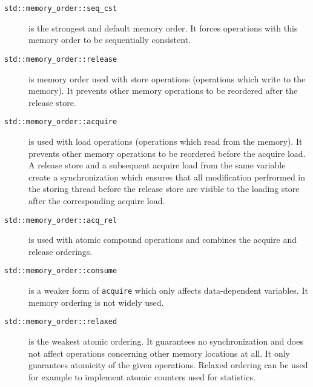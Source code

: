 \begin{description}
    \item[\texttt{std::memory\_order::seq\_cst}] is the strongest and default
        memory order.
        It forces operations with this memory order to be sequentially
        consistent.

        \item[\texttt{std::memory\_order::release}] is memory order used with
            store operations (operations which write to the memory).
            It prevents other memory operations to be reordered after the
            release store.

        \item[\texttt{std::memory\_order::acquire}] is used with load operations
            (operations which read from the memory).
            It prevents other memory operations to be reordered before the
            acquire load.
            A release store and a subsequent acquire load from the same variable
            create a synchronization which ensures that all modification
            perfrormed in the storing thread before the release store are
            visible to the loading store after the corresponding acquire load.

        \item[\texttt{std::memory\_order::acq\_rel}] is used with atomic
            compound operations and combines the acquire and release orderings.

        \item[\texttt{std::memory\_order::consume}] is a weaker form of
            \texttt{acquire} which only affects data-dependent variables.
            It memory ordering is not widely used.

        \item[\texttt{std::memory\_order::relaxed}] is the weakest atomic
            ordering.
            It guarantees no synchronization and does not affect operations
            concerning other memory locations at all.
            It only guarantees atomicity of the given operations.
            Relaxed ordering can be used for example to implement atomic
            counters used for statistics.
\end{description}




